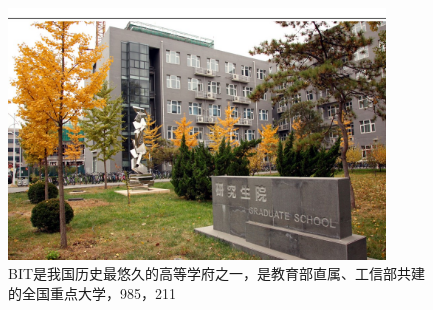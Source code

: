 \begin{figure}
  \centering
  \begin{minipage}[b]{0.6\textwidth}
  \captionstyle{\centering}
  \centering
  \includegraphics[width=10cm]{figures/pic2}
  \caption{BIT是我国历史最悠久的高等学府之一，是教育部直属、工信部共建的全国重点大学，985，211}
  \label{fig:longcaptiongood}
   \end{minipage}     
\end{figure}

